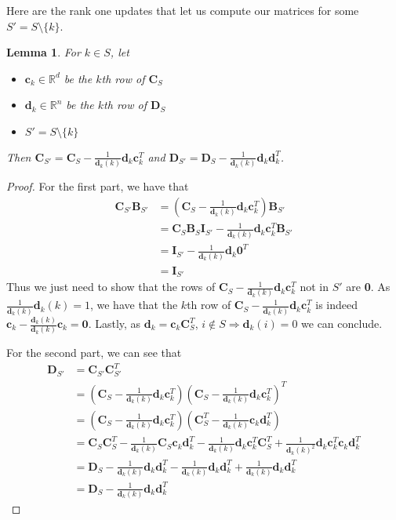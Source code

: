 \documentclass[12pt]{article}
\newtheorem{lemma}[theorem]{Lemma}
\begin{document}
Here are the rank one updates that let us compute our matrices for some $S'=S\setminus\{k\}$.
\begin{lemma}\label{update_lemma}
For $k\in S$, let 
\begin{itemize}
\item $\textbf{c}_k\in\mathbb{R}^{d}$ be the $k$th row of $\textbf{C}_S$
\item $\textbf{d}_k\in\mathbb{R}^{n}$ be the $k$th row of $\textbf{D}_S$
\item $S'= S\setminus\{k\}$
\end{itemize}
Then $\textbf{C}_{S'}=\textbf{C}_S-\frac{1}{\textbf{d}_k(k)}\textbf{d}_k\textbf{c}_k^T$ and $\textbf{D}_{S'}=\textbf{D}_S-\frac{1}{\textbf{d}_k(k)}\textbf{d}_k\textbf{d}_k^T$.
\end{lemma}
\begin{proof}
For the first part, we have that\begin{align*}
\textbf{C}_{S'}\textbf{B}_{S'}&=\left(\textbf{C}_S-\frac{1}{\textbf{d}_k(k)}\textbf{d}_k\textbf{c}_k^T\right)\textbf{B}_{S'}\\
&=\textbf{C}_S\textbf{B}_S\textbf{I}_{S'}-\frac{1}{\textbf{d}_k(k)}\textbf{d}_k\textbf{c}_k^T\textbf{B}_{S'}\\
&=\textbf{I}_{S'}-\frac{1}{\textbf{d}_k(k)}\textbf{d}_k\textbf{0}^T\\
&=\textbf{I}_{S'}\end{align*}
Thus we just need to show that the rows of $\textbf{C}_S-\frac{1}{\textbf{d}_k(k)}\textbf{d}_k\textbf{c}_k^T$ not in $S'$ are \textbf{0}. As $\frac{1}{\textbf{d}_k(k)}\textbf{d}_k(k)=1$, we have that the $k$th row of $\textbf{C}_S-\frac{1}{\textbf{d}_k(k)}\textbf{d}_k\textbf{c}_k^T$ is indeed $\textbf{c}_k-\frac{\textbf{d}_k(k)}{\textbf{d}_k(k)}\textbf{c}_k=\textbf{0}$. Lastly, as $\textbf{d}_k=\textbf{c}_k\textbf{C}_S^T$, $i\not\in S\Rightarrow \textbf{d}_k(i)=0$ we can conclude.

For the second part, we can see that \begin{align*}
\textbf{D}_{S'}&=\textbf{C}_{S'}\textbf{C}_{S'}^T\\
&=\left(\textbf{C}_S-\frac{1}{\textbf{d}_k(k)}\textbf{d}_k\textbf{c}_k^T\right)\left(\textbf{C}_S-\frac{1}{\textbf{d}_k(k)}\textbf{d}_k\textbf{c}_k^T\right)^T\\
&=\left(\textbf{C}_S-\frac{1}{\textbf{d}_k(k)}\textbf{d}_k\textbf{c}_k^T\right)\left(\textbf{C}_S^T-\frac{1}{\textbf{d}_k(k)}\textbf{c}_k\textbf{d}_k^T\right)\\
&=\textbf{C}_S\textbf{C}_S^T-\frac{1}{\textbf{d}_k(k)}\textbf{C}_S\textbf{c}_k\textbf{d}_k^T-\frac{1}{\textbf{d}_k(k)}\textbf{d}_k\textbf{c}_k^T\textbf{C}_S^T+\frac{1}{\textbf{d}_k(k)^2}\textbf{d}_k\textbf{c}_k^T\textbf{c}_k\textbf{d}_k^T\\
&=\textbf{D}_S-\frac{1}{\textbf{d}_k(k)}\textbf{d}_k\textbf{d}_k^T-\frac{1}{\textbf{d}_k(k)}\textbf{d}_k\textbf{d}_k^T+\frac{1}{\textbf{d}_k(k)}\textbf{d}_k\textbf{d}_k^T\\
&=\textbf{D}_S-\frac{1}{\textbf{d}_k(k)}\textbf{d}_k\textbf{d}_k^T\end{align*}\end{proof}
\end{document}
